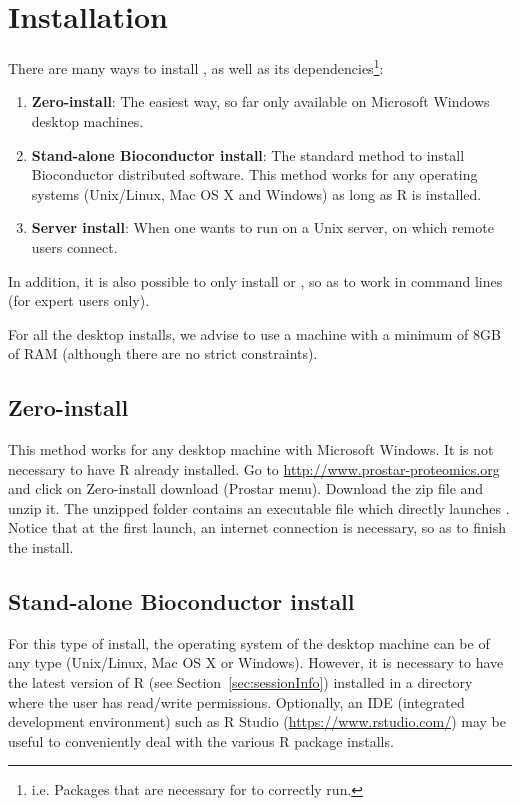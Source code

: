 \documentclass[12pt]{article}
\begin{document}
\section{Installation}\label{sec:install}

There are many ways to install , as well as its dependencies\footnote{i.e. Packages
that are necessary for  to correctly run.}:
\begin{enumerate}
	\item \textbf{Zero-install}: The easiest way, so far only available on Microsoft Windows desktop machines.
	\item \textbf{Stand-alone Bioconductor install}: The standard method to install Bioconductor distributed software. 
	This method works for any operating systems (Unix/Linux, Mac OS X and Windows) as long as R is installed.
	\item \textbf{Server install}: When one wants  to run on a Unix server, on which remote users connect.
\end{enumerate}
In addition, it is also possible to only install  or ,
so as to work in command lines (for expert users only).

For all the desktop installs, we advise to use a machine with a minimum of 8GB of RAM (although there are no strict constraints).

\subsection{Zero-install}
This method works for any desktop machine with Microsoft Windows. It is not necessary to have R already installed.
Go to \url{http://www.prostar-proteomics.org} and click on Zero-install download (Prostar menu). Download the zip file and unzip it.
The unzipped folder contains an executable file which directly launches . Notice that at the first launch,
an internet connection is necessary, so as to finish the install.

\subsection{Stand-alone Bioconductor install}\label{sec:daparProstarstandalone}

For this type of install, the operating system of the desktop machine can be of any type (Unix/Linux, Mac OS X or Windows).
However, it is necessary to have the latest version of R (see Section~\ref{sec:sessionInfo}) installed in a directory where the user has read/write permissions. 
Optionally, an IDE (integrated development environment) such as R Studio (\url{https://www.rstudio.com/}) may be useful to conveniently deal with the various R package installs.
\end{document}
